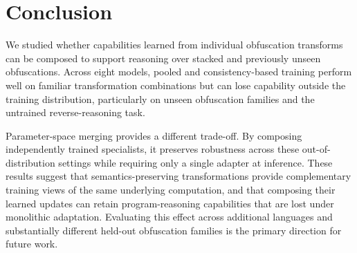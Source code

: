 \section{Conclusion}

We studied whether capabilities learned from individual obfuscation transforms
can be composed to support reasoning over stacked and previously unseen
obfuscations. Across eight models, pooled and consistency-based training perform
well on familiar transformation combinations but can lose capability outside
the training distribution, particularly on unseen obfuscation families and the
untrained reverse-reasoning task.

Parameter-space merging provides a different trade-off. By composing
independently trained specialists, it preserves robustness across these
out-of-distribution settings while requiring only a single adapter at inference.
These results suggest that semantics-preserving transformations provide
complementary training views of the same underlying computation, and that
composing their learned updates can retain program-reasoning capabilities that
are lost under monolithic adaptation. Evaluating this effect across additional
languages and substantially different held-out obfuscation families is the
primary direction for future work.